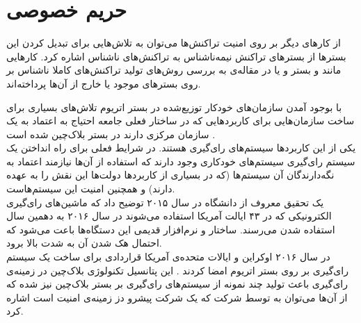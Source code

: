 \section{حریم خصوصی}
از کارهای دیگر بر روی امنیت تراکنش‌ها می‌توان به تلاش‌هایی برای تبدیل کردن این بستر‌ها از بسترهای تراکنش نیمه‌ناشناس به تراکنش‌های ناشناس اشاره کرد. کارهایی مانند 
\cite{zerocash}
و بستر 
\cite{hawk}
و یا 
در مقاله‌ی 
\cite{blind}
به بررسی روش‌های تولید تراکنش‌های کاملا ناشناس بر روی بستر‌های موجود یا خارج از آن‌ها پرداخته‌اند. 

با بوجود آمدن سازمان‌های خودکار توزیع‌شده در بستر اتریوم تلاش‌های بسیاری برای ساخت سازمان‌هایی برای کاربردهایی که در ساختار فعلی جامعه‌ احتیاج به اعتماد به یک سازمان مرکزی دارند در بستر بلاک‌چین شده است .
\\
یکی از این کاربردها سیستم‌های رای‌گیری هستند. در شرایط فعلی برای راه انداختن یک سیستم رای‌گیری سیستم‌های خودکاری وجود دارند که استفاده‌ از آن‌ها نیازمند اعتماد به نگه‌دارندگان آن سیستم‌ها (که در بسیاری از کاربردها دولت‌ها این نقش را به عهده دارند) و همچنین امنیت‌ این سیستم‌هاست. 
\\
یک تحقیق معروف از دانشگاه‌  در سال ۲۰۱۵ 
توضیح داد که ماشین‌های رای‌گیری الکترونیکی که در ۴۳ ایالت آمریکا استفاده می‌شوند در سال ۲۰۱۶ به دهمین سال استفاده شدن می‌رسند. ساختار و نرم‌افزار قدیمی این دستگاه‌ها باعت می‌شود که احتمال هک شدن آن‌ به شدت بالا برود. 
\\
در سال ۲۰۱۶  اوکراین و ایالات متحده‌ی آمریکا قراردادی برای ساخت یک سیستم‌ رای‌گیری بر روی بستر اتریوم امضا کردند
. این پتانسیل تکنولوژی بلاک‌چین در زمینه‌ی رای‌گیری باعث تولید چند نمونه 
\cite{rosgood}
از سیستم‌های رای‌گیری بر بستر بلاک‌چین نیز شده که از آن‌ها می‌توان به 
\cite{votebook}
توسط شرکت 
که یک شرکت پیشرو دز زمینه‌ی امنیت است اشاره کرد.

